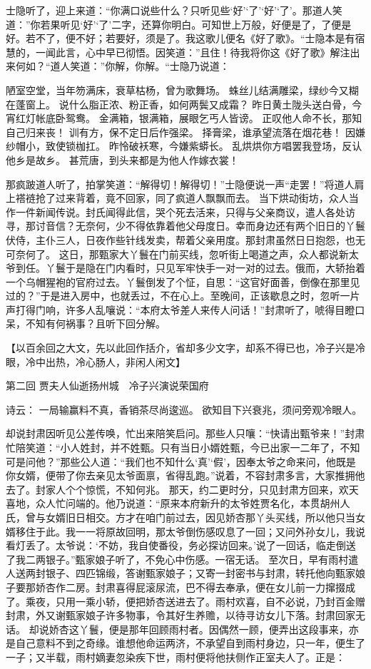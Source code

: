\documentclass[12pt,oneside]{book}
\begin{document}
士隐听了，迎上来道：“你满口说些什么？只听见些‘好’‘了’‘好’‘了’。那道人笑道：”你若果听见‘好’‘了’二字，还算你明白。可知世上万般，好便是了，了便是好。若不了，便不好；若要好，须是了。我这歌儿便名《好了歌》。“士隐本是有宿慧的，一闻此言，心中早已彻悟。因笑道：”且住！待我将你这《好了歌》解注出来何如？“道人笑道：”你解，你解。“士隐乃说道：

陋室空堂，当年笏满床，衰草枯杨，曾为歌舞场。
蛛丝儿结满雕梁，绿纱今又糊在蓬窗上。
说什么脂正浓、粉正香，如何两鬓又成霜？
昨日黄土陇头送白骨，今宵红灯帐底卧鸳鸯。
金满箱，银满箱，展眼乞丐人皆谤。
正叹他人命不长，那知自己归来丧！
训有方，保不定日后作强梁。
择膏梁，谁承望流落在烟花巷！
因嫌纱帽小，致使锁枷扛。
昨怜破袄寒，今嫌紫蟒长。
乱烘烘你方唱罢我登场，反认他乡是故乡。
甚荒唐，到头来都是为他人作嫁衣裳！

那疯跛道人听了，拍掌笑道：“解得切！解得切！”士隐便说一声“走罢！”将道人肩上褡裢抢了过来背着，竟不回家，同了疯道人飘飘而去。
当下烘动街坊，众人当作一件新闻传说。封氏闻得此信，哭个死去活来，只得与父亲商议，遣人各处访寻，那讨音信？无奈何，少不得依靠着他父母度日。幸而身边还有两个旧日的丫鬟伏侍，主仆三人，日夜作些针线发卖，帮着父亲用度。那封肃虽然日日抱怨，也无可奈何了。
这日，那甄家大丫鬟在门前买线，忽听街上喝道之声，众人都说新太爷到任。丫鬟于是隐在门内看时，只见军牢快手一对一对的过去。俄而，大轿抬着一个乌帽猩袍的官府过去。丫鬟倒发了个怔，自思：“这官好面善，倒像在那里见过的？”于是进入房中，也就丢过，不在心上。至晚间，正该歇息之时，忽听一片声打得门响，许多人乱嚷说：“本府太爷差人来传人问话！”封肃听了，唬得目瞪口呆，不知有何祸事？且听下回分解。


 
【以百余回之大文，先以此回作括介，省却多少文字，却系不得已也，冷子兴是冷眼，冷中出热，冷心肠人，非闲人闲文】

第二回  贾夫人仙逝扬州城　冷子兴演说荣国府

诗云：
一局输赢料不真，香销茶尽尚逡巡。
欲知目下兴衰兆，须问旁观冷眼人。

却说封肃因听见公差传唤，忙出来陪笑启问。那些人只嚷：“快请出甄爷来！”封肃忙陪笑道：“小人姓封，并不姓甄。只有当日小婿姓甄，今已出家一二年了，不知可是问他？”那些公人道：“我们也不知什么‘真’‘假’，因奉太爷之命来问，他既是你女婿，便带了你去亲见太爷面禀，省得乱跑。”说着，不容封肃多言，大家推拥他去了。封家人个个惊慌，不知何兆。
那天，约二更时分，只见封肃方回来，欢天喜地，众人忙问端的。他乃说道：“原来本府新升的太爷姓贾名化，本贯胡州人氏，曾与女婿旧日相交。方才在咱门前过去，因见娇杏那丫头买线，所以他只当女婿移住于此。我一一将原故回明，那太爷倒伤感叹息了一回；又问外孙女儿，我说看灯丢了。太爷说：‘不妨，我自使番役，务必探访回来。’说了一回话，临走倒送了我二两银子。”甄家娘子听了，不免心中伤感。一宿无话。
至次日，早有雨村遣人送两封银子、四匹锦缎，答谢甄家娘子；又寄一封密书与封肃，转托他向甄家娘子要那娇杏作二房。封肃喜得屁滚尿流，巴不得去奉承，便在女儿前一力撺掇成了。乘夜，只用一乘小轿，便把娇杏送进去了。雨村欢喜，自不必说，乃封百金赠封肃，外又谢甄家娘子许多物事，令其好生养赡，以待寻访女儿下落。封肃回家无话。
却说娇杏这丫鬟，便是那年回顾雨村者。因偶然一顾，便弄出这段事来，亦是自己意料不到之奇缘。谁想他命运两济，不承望自到雨村身边，只一年，便生了一子；又半载，雨村嫡妻忽染疾下世，雨村便将他扶侧作正室夫人了。正是：
\end{document}
